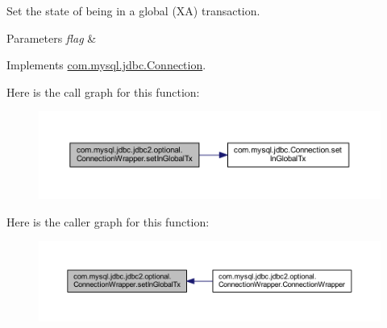 Set the state of being in a global (XA) transaction.


\begin{DoxyParams}{Parameters}
{\em flag} & \\
\hline
\end{DoxyParams}


Implements \mbox{\hyperlink{interfacecom_1_1mysql_1_1jdbc_1_1_connection_ae5192425468c89f3d404ed0dece17cfc}{com.\+mysql.\+jdbc.\+Connection}}.

Here is the call graph for this function\+:
\nopagebreak
\begin{figure}[H]
\begin{center}
\leavevmode
\includegraphics[width=350pt]{classcom_1_1mysql_1_1jdbc_1_1jdbc2_1_1optional_1_1_connection_wrapper_ad2b00fa8ecb1c3455f2f2725ca9fc29c_cgraph}
\end{center}
\end{figure}
Here is the caller graph for this function\+:
\nopagebreak
\begin{figure}[H]
\begin{center}
\leavevmode
\includegraphics[width=350pt]{classcom_1_1mysql_1_1jdbc_1_1jdbc2_1_1optional_1_1_connection_wrapper_ad2b00fa8ecb1c3455f2f2725ca9fc29c_icgraph}
\end{center}
\end{figure}
\mbox{\label{classcom_1_1mysql_1_1jdbc_1_1jdbc2_1_1optional_1_1_connection_wrapper_af88d96aed55dd2fdd401b0d86dcc700d}} 
